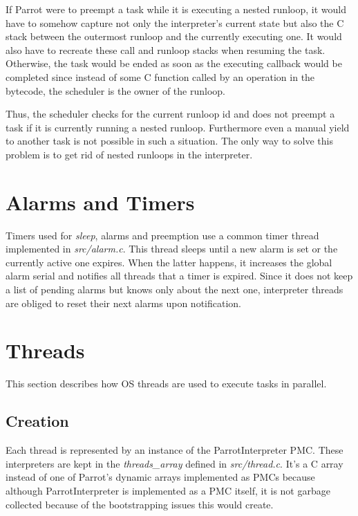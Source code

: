 \documentclass[bachelor,english]{hgbthesis}
\begin{document}
If Parrot were to preempt a task while it is executing a nested runloop, it would have to somehow capture not only the interpreter's current state but also the C stack between the outermost runloop and the currently executing one. It would also have to recreate these call and runloop stacks when resuming the task. Otherwise, the task would be ended as soon as the executing callback would be completed since instead of some C function called by an operation in the bytecode, the scheduler is the owner of the runloop.

Thus, the scheduler checks for the current runloop id and does not preempt a task if it is currently running a nested runloop. Furthermore even a manual yield to another task is not possible in such a situation. The only way to solve this problem is to get rid of nested runloops in the interpreter.

\section{Alarms and Timers}

Timers used for \textit{sleep}, alarms and preemption use a common timer thread implemented in \textit{src/alarm.c}. This thread sleeps until a new alarm is set or the currently active one expires. When the latter happens, it increases the global alarm serial and notifies all threads that a timer is expired. Since it does not keep a list of pending alarms but knows only about the next one, interpreter threads are obliged to reset their next alarms upon notification.

\section{Threads}

This section describes how OS threads are used to execute tasks in parallel.

\subsection{Creation}
\label{subsec:thread_creation}

Each thread is represented by an instance of the ParrotInterpreter PMC. These interpreters are kept in the \textit{threads\_array} defined in \textit{src/thread.c}. It's a C array instead of one of Parrot's dynamic arrays implemented as PMCs because although ParrotInterpreter is implemented as a PMC itself, it is not garbage collected because of the bootstrapping issues this would create.
\end{document}

